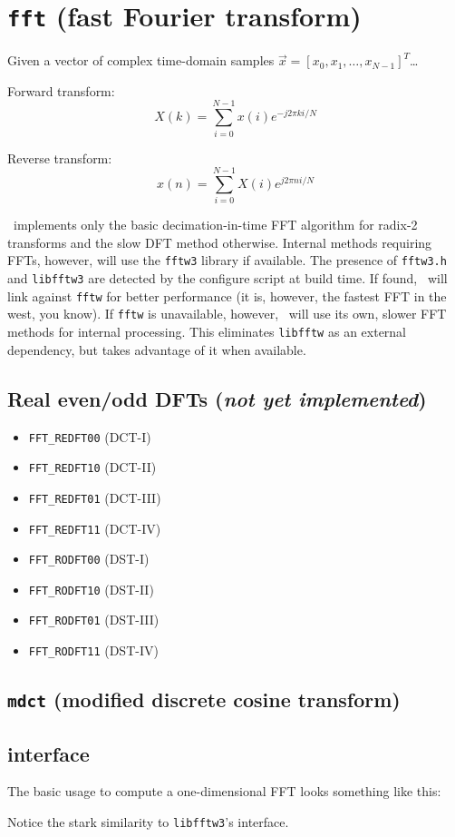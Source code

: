 % 
%

\newpage
\section{{\tt fft} (fast Fourier transform)}
\label{module:fft}

Given a vector of complex time-domain samples
$\vec{x} = \left[x_0,x_1,\ldots,x_{N-1}\right]^T$\ldots

Forward transform:
\[
    X(k) = \sum_{i=0}^{N-1}{x(i) e^{-j 2 \pi k i/N}}
\]

Reverse transform:
\[
    x(n) = \sum_{i=0}^{N-1}{X(i) e^{ j 2 \pi n i/N}}
\]

\liquid\ implements only the basic decimation-in-time FFT algorithm for
radix-2 transforms and the slow DFT method otherwise.
Internal methods requiring FFTs, however, will use the {\tt fftw3} library
\cite{fftw:web} if available.
The presence of {\tt fftw3.h} and {\tt libfftw3} are detected by the configure
script at build time.
If found, \liquid\ will link against {\tt fftw} for better performance (it is,
however, the fastest FFT in the west, you know).
If {\tt fftw} is unavailable, however, \liquid\ will use its own, slower FFT
methods for internal processing.
This eliminates {\tt libfftw} as an external dependency, but takes advantage
of it when available.

\subsection{Real even/odd DFTs ({\it not yet implemented})}
\label{module:fft:r2r}

\begin{itemize}
\item {\tt FFT\_REDFT00} (DCT-I)
\item {\tt FFT\_REDFT10} (DCT-II)
\item {\tt FFT\_REDFT01} (DCT-III)
\item {\tt FFT\_REDFT11} (DCT-IV)

\item {\tt FFT\_RODFT00} (DST-I)
\item {\tt FFT\_RODFT10} (DST-II)
\item {\tt FFT\_RODFT01} (DST-III)
\item {\tt FFT\_RODFT11} (DST-IV)
\end{itemize}

\subsection{{\tt mdct} (modified discrete cosine transform)}
\label{module:fft:mdct}

\subsection{interface}
The basic usage to compute a one-dimensional FFT looks something like this:
%

%
Notice the stark similarity to {\tt libfftw3}'s interface.

